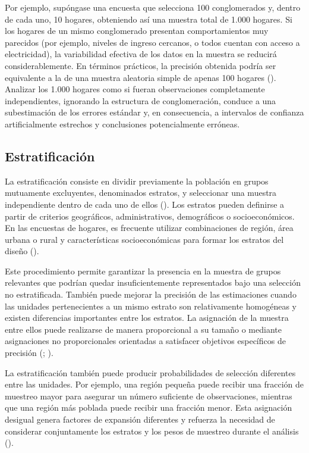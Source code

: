 \documentclass[
  spanish,
  11pt,
  letterpaper,
  oneside,
  open=any]{scrbook}
\begin{document}
Por ejemplo, supóngase una encuesta que selecciona 100 conglomerados y,
dentro de cada uno, 10 hogares, obteniendo así una muestra total de
1.000 hogares. Si los hogares de un mismo conglomerado presentan
comportamientos muy parecidos (por ejemplo, niveles de ingreso cercanos,
o todos cuentan con acceso a electricidad), la variabilidad efectiva de
los datos en la muestra se reducirá considerablemente. En términos
prácticos, la precisión obtenida podría ser equivalente a la de una
muestra aleatoria simple de apenas 100 hogares
(). Analizar los
1.000 hogares como si fueran observaciones completamente independientes,
ignorando la estructura de conglomeración, conduce a una subestimación
de los errores estándar y, en consecuencia, a intervalos de confianza
artificialmente estrechos y conclusiones potencialmente erróneas.

\subsection{Estratificación}\label{estratificaciuxf3n}

La estratificación consiste en dividir previamente la población en
grupos mutuamente excluyentes, denominados estratos, y seleccionar una
muestra independiente dentro de cada uno de ellos
(). Los estratos
pueden definirse a partir de criterios geográficos, administrativos,
demográficos o socioeconómicos. En las encuestas de hogares, es
frecuente utilizar combinaciones de región, área urbana o rural y
características socioeconómicas para formar los estratos del diseño
().

Este procedimiento permite garantizar la presencia en la muestra de
grupos relevantes que podrían quedar insuficientemente representados
bajo una selección no estratificada. También puede mejorar la precisión
de las estimaciones cuando las unidades pertenecientes a un mismo
estrato son relativamente homogéneas y existen diferencias importantes
entre los estratos. La asignación de la muestra entre ellos puede
realizarse de manera proporcional a su tamaño o mediante asignaciones no
proporcionales orientadas a satisfacer objetivos específicos de
precisión (;
).

La estratificación también puede producir probabilidades de selección
diferentes entre las unidades. Por ejemplo, una región pequeña puede
recibir una fracción de muestreo mayor para asegurar un número
suficiente de observaciones, mientras que una región más poblada puede
recibir una fracción menor. Esta asignación desigual genera factores de
expansión diferentes y refuerza la necesidad de considerar conjuntamente
los estratos y los pesos de muestreo durante el análisis
().
\end{document}
